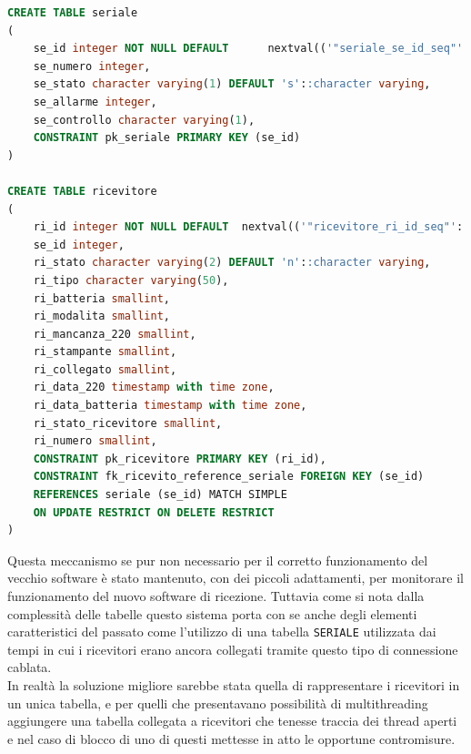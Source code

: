 \begin{lstlisting}[language=SQL,caption=Tabelle ricevitori,label=lst:sqlricevitori]
CREATE TABLE seriale
(
	se_id integer NOT NULL DEFAULT 		nextval(('"seriale_se_id_seq"'::text)::regclass),
	se_numero integer,
	se_stato character varying(1) DEFAULT 's'::character varying,
	se_allarme integer,
	se_controllo character varying(1),
	CONSTRAINT pk_seriale PRIMARY KEY (se_id)
)

CREATE TABLE ricevitore
(
	ri_id integer NOT NULL DEFAULT 	nextval(('"ricevitore_ri_id_seq"'::text)::regclass),
	se_id integer,
	ri_stato character varying(2) DEFAULT 'n'::character varying,
	ri_tipo character varying(50),
	ri_batteria smallint,
	ri_modalita smallint,
	ri_mancanza_220 smallint,
	ri_stampante smallint,
	ri_collegato smallint,
	ri_data_220 timestamp with time zone,
	ri_data_batteria timestamp with time zone,
	ri_stato_ricevitore smallint,
	ri_numero smallint,
	CONSTRAINT pk_ricevitore PRIMARY KEY (ri_id),
	CONSTRAINT fk_ricevito_reference_seriale FOREIGN KEY (se_id)
	REFERENCES seriale (se_id) MATCH SIMPLE
	ON UPDATE RESTRICT ON DELETE RESTRICT
)
\end{lstlisting}
Questa meccanismo se pur non necessario per il corretto funzionamento del vecchio software è stato mantenuto, con dei piccoli adattamenti, per monitorare il funzionamento del nuovo software di ricezione.
Tuttavia come si nota dalla complessità delle tabelle questo sistema porta con se anche degli elementi caratteristici del passato come l'utilizzo di una tabella \texttt{SERIALE} utilizzata dai tempi in cui i ricevitori erano ancora collegati tramite questo tipo di connessione cablata.\\
In realtà la soluzione migliore sarebbe stata quella di rappresentare i ricevitori in un unica tabella, e per quelli che presentavano possibilità di multithreading aggiungere una tabella collegata a ricevitori che tenesse traccia dei thread aperti e nel caso di blocco di uno di questi mettesse in atto le opportune contromisure.

